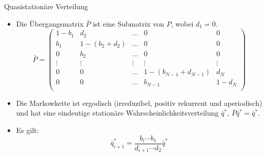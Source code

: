 \documentclass{beamer}
\begin{document}
\begin{frame}{Quasistationäre Verteilung}
  \begin{itemize}
    \item Die Übergangsmatrix $\bar{P}$ ist eine Submatrix von $P$, wobei $d_1 = 0$.
      \[
      \bar{P} = \begin{pmatrix}
        1-b_1 & d_2 & \dots & 0 & 0 \\
        b_1 & 1 - (b_2 + d_2) &  \dots & 0 & 0 \\
        0 & b_2 & \dots & 0 & 0 \\
        \vdots & \vdots & \vdots & \vdots & \vdots \\
        0 & 0  &  \dots & 1 - (b_{N-1} + d_{N-1}) & d_N \\
        0 & 0  &  \dots & b_{N-1} & 1 - d_N \\
      \end{pmatrix}
    \]
  \item Die Markowkette ist ergodisch (irreduzibel, positiv rekurrent und aperiodisch) und hat eine eindeutige stationäre Wahrscheinlichkeitsverteilung $\bar{q}^*$, $\bar{P}\bar{q}^* = \bar{q}^*$.
  \item Es gilt:
    \[
      \bar{q}^*_{i+1} = \frac{b_i \cdots b_1}{d_{i+1}\cdots d_2}\bar{q}^*
    \]
  \end{itemize}
\end{frame}
\end{document}
